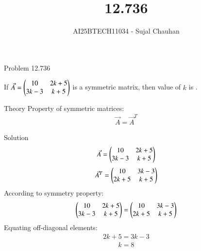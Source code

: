 \documentclass{beamer}
\title{12.736}
\author{AI25BTECH11034 - Sujal Chauhan}
\begin{document}
\frame{\titlepage}

\begin{frame}{Problem}
12.736

If $\Vec{A} = \begin{pmatrix}10 & 2k+5\\ 3k-3 & k+5\end{pmatrix}$ is a symmetric matrix, then value of $k$ is .
\end{frame}

\begin{frame}{Theory}
Property of symmetric matrices:
\begin{align}
    \Vec{A} = \Vec{A}^T
\end{align}
\end{frame}

\begin{frame}{Solution}
\begin{align}
    \Vec{A} = \begin{pmatrix}10 & 2k+5 \\ 3k-3 & k+5\end{pmatrix}
\end{align}
\begin{align}
    \Vec{A}^T = \begin{pmatrix}10 & 3k-3\\ 2k+5 & k+5\end{pmatrix}
\end{align}
According to symmetry property:
\begin{align}
    \begin{pmatrix}10 & 2k+5 \\ 3k-3 & k+5\end{pmatrix} = \begin{pmatrix}10 & 3k-3\\ 2k+5 & k+5\end{pmatrix}
\end{align}
Equating off-diagonal elements:
\begin{align}
    2k+5 = 3k-3
\end{align}
\begin{align}
    k = 8
\end{align}
\end{frame}
\end{document}
